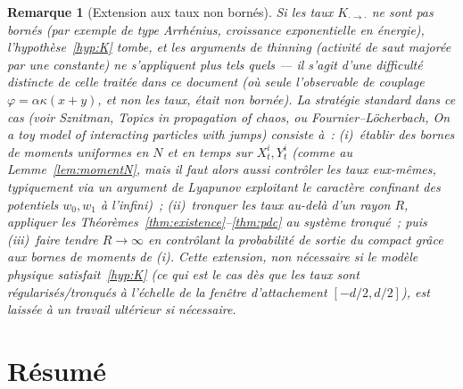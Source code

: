 \documentclass[11pt,a4paper]{article}
\theoremstyle{plain}
\newtheorem*{remark*}{Remarque}
\theoremstyle{definition}
\begin{document}
\begin{remark*}[Extension aux taux non born\'es]
\label{rem:unbounded}
Si les taux $K_{\cdot\to\cdot}$ ne sont pas born\'es (par exemple de type Arrh\'enius, croissance exponentielle en \'energie), l'hypoth\`ese~\ref{hyp:K} tombe, et les arguments de thinning (activit\'e de saut major\'ee par une constante) ne s'appliquent plus tels quels --- il s'agit d'une difficult\'e distincte de celle trait\'ee dans ce document (o\`u seule l'observable de couplage $\varphi=\alpha\kappa(x+y)$, et non les taux, \'etait non born\'ee). La strat\'egie standard dans ce cas (voir Sznitman, \emph{Topics in propagation of chaos}, ou Fournier--L\"ocherbach, \emph{On a toy model of interacting particles with jumps}) consiste \`a~: (i)~\'etablir des bornes de moments uniformes en $N$ et en temps sur $X_t^i,Y_t^i$ (comme au Lemme~\ref{lem:momentN}, mais il faut alors aussi contr\^oler les taux eux-m\^emes, typiquement via un argument de Lyapunov exploitant le caract\`ere confinant des potentiels $w_0,w_1$ \`a l'infini)~; (ii)~tronquer les taux au-del\`a d'un rayon $R$, appliquer les Th\'eor\`emes~\ref{thm:existence}--\ref{thm:pdc} au syst\`eme tronqu\'e~; puis (iii)~faire tendre $R\to\infty$ en contr\^olant la probabilit\'e de sortie du compact gr\^ace aux bornes de moments de (i). Cette extension, non n\'ecessaire si le mod\`ele physique satisfait~\ref{hyp:K} (ce qui est le cas d\`es que les taux sont r\'egularis\'es/tronqu\'es \`a l'\'echelle de la fen\^etre d'attachement $[-d/2,d/2]$), est laiss\'ee \`a un travail ult\'erieur si n\'ecessaire.
\end{remark*}

\section*{R\'esum\'e}
\end{document}
